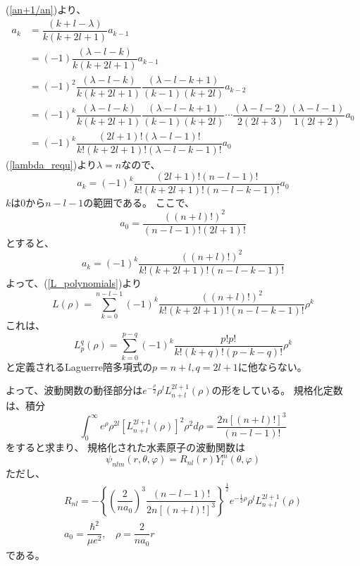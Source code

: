 \documentclass[a4paper,16pt]{jsarticle}
\begin{document}
(\ref{an+1/an})より、
\begin{align}
	a_k &= \dfrac{(k+l-\lambda)}{k(k+2l+1)}a_{k-1} \\
			&= (-1)\dfrac{(\lambda-l-k)}{k(k+2l+1)}a_{k-1} \\
			&= (-1)^2\dfrac{(\lambda-l-k)}{k(k+2l+1)}\dfrac{(\lambda-l-k+1)}{(k-1)(k+2l)}a_{k-2} \\
			&= (-1)^k\dfrac{(\lambda-l-k)}{k(k+2l+1)}\dfrac{(\lambda-l-k+1)}{(k-1)(k+2l)}
			\cdots\dfrac{(\lambda-l-2)}{2(2l+3)}\dfrac{(\lambda-l-1)}{1(2l+2)}a_0 \\
			&= (-1)^k\dfrac{(2l+1)!(\lambda-l-1)!}{k!(k+2l+1)!(\lambda-l-k-1)!}a_0
\end{align}
(\ref{lambda_requ})より$\lambda = n$なので、
\begin{equation}
	a_k = (-1)^k\dfrac{(2l+1)!(n-l-1)!}{k!(k+2l+1)!(n-l-k-1)!}a_0
\end{equation}
$k$は$0$から$n-l-1$の範囲である。
ここで、
\begin{equation}
	a_0 = \dfrac{((n+l)!)^2}{(n−l−1)!(2l+1)!}
\end{equation}
とすると、
\begin{equation}
	a_k = (-1)^{k}\dfrac{((n+l)!)^2}{k!(k+2l+1)!(n-l-k-1)!}
\end{equation}
よって、(\ref{L_polynomials})より
\begin{equation}
	L(\rho) = \sum_{k=0}^{n-l-1}(-1)^{k}\dfrac{((n+l)!)^2}{k!(k+2l+1)!(n-l-k-1)!}\rho^k
\end{equation}
これは、
\begin{equation}
	L_p^q(\rho) = \sum_{k = 0}^{p-q} (-1)^{k} \dfrac{p!p!}{k!(k+q)!(p-k-q)!}\rho^k
\end{equation}
と定義されるLaguerre陪多項式の$p = n+l,q = 2l+1$に他ならない。

よって、波動関数の動径部分は$e^{-\frac{\rho}{2}}\rho^l L_{n+l}^{2l+1}(\rho)$の形をしている。
規格化定数は、積分
\begin{equation}
	\int_0^\infty e^\rho \rho^{2l} [L_{n+l}^{2l+1}(\rho)]^2 \rho^2 d\rho
	= \dfrac{2n[(n+l)!]^3}{(n-l-1)!}
\end{equation}
をすると求まり、
規格化された水素原子の波動関数は
\begin{equation}
	\psi_{nlm}(r,\theta,\varphi) = R_{nl}(r)Y_l^m(\theta,\varphi)
\end{equation}
ただし、
\begin{align}
	R_{nl} = - \left\{ \left(\dfrac{2}{na_0}\right)^3\dfrac{(n-l-1)!}{2n[(n+l)!]^3}\right\}^{\frac{1}{2}}e^{-\frac{1}{2}\rho}\rho^l L_{n+l}^{2l+1}(\rho) \\
	a_0 = \dfrac{\hbar^2}{\mu e^2},~~~~\rho = \dfrac{2}{n a_0}r
\end{align}
である。
\end{document}
